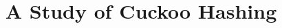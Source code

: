 \documentclass[12pt,conference,compsoc]{IEEEtran}
\begin{document}
%
\title{A Study of Cuckoo Hashing}


\author{}


% 








\maketitle
\end{document}
